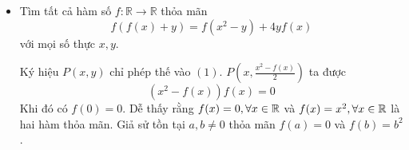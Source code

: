 \documentclass[11pt]{scrartcl}
\begin{document}
\begin{itemize}[label=, leftmargin=0em, itemsep=0.5em]
\begin{sol}
\begin{proof}
            Do $f$ bị chặn trên đoạn $[a , b]$ nên $\exists M \in \mathbb{R}$ sao cho
            $$
            f(x)<M, \forall x \in[a , b] .
            $$

            Ta sẽ chứng minh hàm số $f$ cũng bị chặn trên đoạn $[0 , b-a]$.
            Thật vậy, với mọi $x \in[0 , b-a]$ thì $x+a \in[a , b]$. Ta có
            $$
            f(x+a)=f(x)+f(a) \Rightarrow f(x)=f(x+a)-f(a) \Rightarrow-2 M<f(x)<2 M .
            $$

            Vậy $|f(x)|<2 M, \forall x \in[0 , b-a]$, hay $f$ cũng bị chặn trên đoạn $[0 , b-a]$.
            Đặt $b-a=d>0$, khi đó $f$ bị chặn trên $[0 , d]$. Đặt $c=\frac{f(d)}{d}, g(x)=f(x)-c x$. Khi đó với mọi $x \in \mathbb{R}, y \in \mathbb{R}$ thì
            $$
            g(x+y)=f(x+y)-c(x+y)=f(x)-c x+f(y)-c y=g(x)+g(y) .
            $$

            Hơn nữa $g(d)=f(d)-c d=0$. Vậy $g(x+d)=g(x), \forall x \in \mathbb{R}$, hay $g$ là hàm tuần hoàn, hơn nữa $g$ cũng bị chặn trên $[0,d]$, kết hợp với tính tuần hoàn của $g$ trên $\bb{R}$, suy ra $g$ bị chặn trên $\bb{R}$. Giả sử tồn tại $x_0$ để $g(x_0) \neq 0$. Khi đó với $n \in \bb{N}$ thì $g(nx_0) = ng(x_0)$, suy ra 
            \[
                |g(nx_0)| = n|g(x_0)|, \forall n \in \bb{N}
            \]
            Do $g(x_0) \neq 0$ nên từ $(2)$ ta có $\dlim|g(nx_0)| =  \dlim|ng(x_0)| = +\infty$, do đó $|g(nx_0)|$ không bị chặn, mẫu thuẫn. Vậy $g(x) = 0, \xr$. Do đó $\boxed{f(x) = cx, \xr}$. Thử lại thì thỏa mãn.
        \end{proof}
        Áp dụng bổ đề trên ta được $f(x) = cx, \xr$, thử lại tìm được $c = 1$. Vậy hàm số thỏa mãn là $\boxed{f(x) = x, \xr}$
    \end{sol}

   
    \item \begin{bt}
        Tìm tất cả hàm số $f: \mathbb{R} \rightarrow \mathbb{R}$ thỏa mãn
            $$
            f(f(x)+y)=f\left(x^2-y\right)+4 y f(x)
            $$
            với mọi số thực $x, y$.
    \end{bt}
    \begin{sol}
        Ký hiệu $P(x,y)$ chỉ phép thế vào $(1)$. $P\left(x,\frac{x^2 - f(x)}{2}\right)$ ta được 
        \[
            (x^2 - f(x))f(x) = 0
        \]
        Khi đó có $f(0) = 0$. Dễ thấy rằng $f(x) = 0 ,\forall x\in \mathbb{R}$ và $f(x) = x^2, \forall x\in \mathbb{R}$ là hai hàm thỏa mãn. Giả sử tồn tại $a,b \neq 0$ thỏa mãn $f(a) = 0$ và $f(b) = b^2$. 


\end{sol}
\end{itemize}
\end{document}
